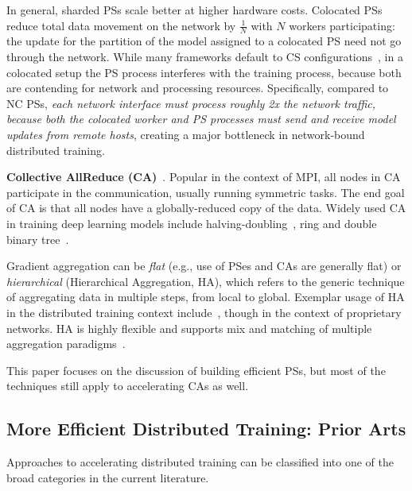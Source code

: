 In general, sharded PSs scale better at higher hardware costs. Colocated PSs reduce total data movement on the network by $\frac{1}{N}$ with $N$ workers participating: the update for the partition of the model assigned to a colocated PS need not go through the network. While many frameworks default to CS configurations~\cite{MXNetont0:online, Distribu25:online}, in a colocated setup the PS process interferes with the training process, because both are contending for network and processing resources. Specifically, compared to NC PSs, \textit{each network interface must process roughly 2x the network traffic, because both the colocated worker and PS processes must send and receive model updates from remote hosts}, creating a major bottleneck in network-bound distributed training. 

\noindent\textbf{Collective AllReduce (CA)}~\cite{Sack:2011:SCM:2522220,Thakur:2005:OCC:2747766.2747771,collectivesOptimization,blum2000architectures,bala1995ccl}. Popular in the context of MPI, all nodes in CA participate in the communication, usually running symmetric tasks. The end goal of CA is that all nodes have a globally-reduced copy of the data. Widely used CA in training deep learning models include halving-doubling~\cite{ImageNetIn1Hour}, ring and double binary tree~\cite{Operatio73:online, Sergeev2018HorovodFA}.

Gradient aggregation can be \textit{flat} (e.g., use of PSes and CAs are generally flat) or \textit{hierarchical} (Hierarchical Aggregation, HA), which refers to the generic technique of aggregating data in multiple steps, from local to global. Exemplar usage of HA in the distributed training context include~\cite{firecaffe,choblueconnect,Geng:2018:HHP:3229543.3229544,sysmlblueconnect}, though in the context of proprietary networks. HA is highly flexible and supports mix and matching of multiple aggregation paradigms~\cite{topoawarempi, cool}.

This paper focuses on the discussion of building efficient PSs, but most of the techniques still apply to accelerating CAs as well. 

\subsection{More Efficient Distributed Training: Prior Arts}
Approaches to accelerating distributed training can be classified into one of the broad categories in the current literature.

